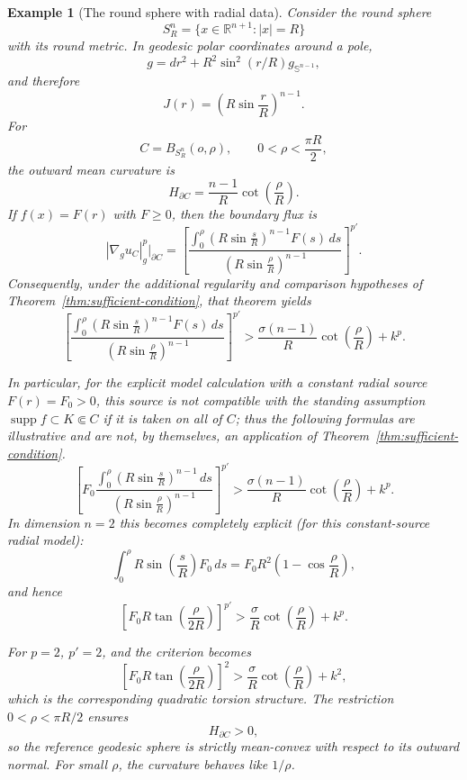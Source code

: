 \documentclass{article}
\renewcommand{\boxed}[1]{#1}
\newtheorem{example}[theorem]{Example}
\begin{document}
\begin{example}[The round sphere with radial data]
Consider the round sphere
\[
S_R^n=\{x\in\mathbb R^{n+1}:|x|=R\}
\]
with its round metric. In geodesic polar coordinates around a pole,
\[
g=dr^2+R^2\sin^2(r/R)g_{\mathbb S^{n-1}},
\]
and therefore
\[
J(r)=\left(R\sin\frac rR\right)^{n-1}.
\]
For
\[
C=B_{S_R^n}(o,\rho),
\qquad
0<\rho<\frac{\pi R}{2},
\]
the outward mean curvature is
\[
H_{\partial C}
=
\frac{n-1}{R}\cot\left(\frac\rho R\right).
\]
If $f(x)=F(r)$ with $F\geq0$, then the boundary flux is
\[
|\nabla_g u_C|_g^p\big|_{\partial C}
=
\left[
\frac{
\displaystyle
\int_0^\rho
\left(R\sin\frac sR\right)^{n-1}F(s)\,ds
}
{\left(R\sin\frac\rho R\right)^{n-1}}
\right]^{p'}.
\]
Consequently, under the additional regularity and comparison hypotheses
of Theorem~\ref{thm:sufficient-condition}, that theorem yields
\[
\boxed{
\left[
\frac{
\displaystyle
\int_0^\rho
\left(R\sin\frac sR\right)^{n-1}F(s)\,ds
}
{\left(R\sin\frac\rho R\right)^{n-1}}
\right]^{p'}
>
\frac{\sigma(n-1)}{R}\cot\left(\frac\rho R\right)+k^p.
}
\]

In particular, for the explicit model calculation with a constant radial
source $F(r)=F_0>0$,
this source is not compatible with the standing assumption
$\operatorname{supp}f\subset K\Subset C$ if it is taken on all of $C$;
thus the following formulas are illustrative and are not, by themselves,
an application of Theorem~\ref{thm:sufficient-condition}.
\[
\boxed{
\left[
F_0
\frac{
\displaystyle
\int_0^\rho
\left(R\sin\frac sR\right)^{n-1}\,ds
}
{\left(R\sin\frac\rho R\right)^{n-1}}
\right]^{p'}
>
\frac{\sigma(n-1)}{R}\cot\left(\frac\rho R\right)+k^p.
}
\]
In dimension $n=2$ this becomes completely explicit (for this constant-source radial model):
\[
\int_0^\rho R\sin\left(\frac sR\right)F_0\,ds
=
F_0R^2\left(1-\cos\frac\rho R\right),
\]
and hence
\begin{equation}
\boxed{
\left[
F_0R\tan\left(\frac\rho{2R}\right)
\right]^{p'}
>
\frac{\sigma}{R}\cot\left(\frac\rho R\right)+k^p.
}
\label{eq:spherical-condition-2d}
\end{equation}

For $p=2$, $p'=2$, and the criterion becomes
\[
\left[F_0R\tan\left(\frac\rho{2R}\right)\right]^2
>
\frac{\sigma}{R}\cot\left(\frac\rho R\right)+k^2,
\]
which is the corresponding quadratic torsion structure. The restriction
$0<\rho<\pi R/2$ ensures
\[
H_{\partial C}>0,
\]
so the reference geodesic sphere is strictly mean-convex with respect to
its outward normal. For small $\rho$, the curvature behaves like $1/\rho$.
\end{example}
\end{document}

